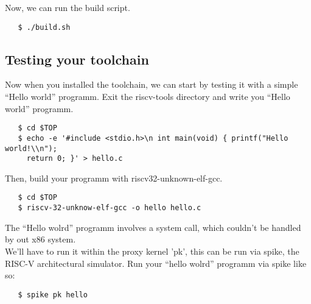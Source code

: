 Now, we can run the build script.

\begin{verbatim}
   $ ./build.sh
\end{verbatim}

\subsection{Testing your toolchain}

Now when you installed the toolchain, we can start by testing it with a simple ``Hello world'' programm.
Exit the riscv-tools directory and write you ``Hello world'' programm.

\begin{verbatim}
   $ cd $TOP
   $ echo -e '#include <stdio.h>\n int main(void) { printf("Hello world!\\n");
     return 0; }' > hello.c
\end{verbatim}

\newpage

Then, build your programm with riscv32-unknown-elf-gcc.

\begin{verbatim}
   $ cd $TOP
   $ riscv-32-unknow-elf-gcc -o hello hello.c
\end{verbatim}

The ``Hello wolrd'' programm involves a system call, which couldn't be handled by out x86 system. \\We'll have to run it within the proxy kernel 'pk', this can be run via spike, the RISC-V architectural simulator. Run your ``hello wolrd'' programm via spike like so:

\begin{verbatim}
   $ spike pk hello
\end{verbatim}
